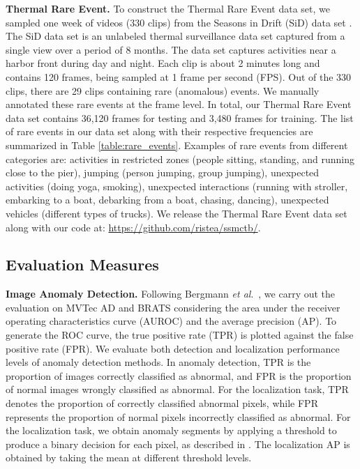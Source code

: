 \documentclass[10pt,journal,compsoc]{IEEEtran}
\newcommand{\etal}{\textit{et al}.}
\begin{document}
\noindent
\textbf{Thermal Rare Event.} To construct the Thermal Rare Event data set, we sampled one week of videos (330 clips) from the Seasons in Drift (SiD) data set \cite{Nikolov-NIPS-2021}. The SiD data set \cite{Nikolov-NIPS-2021} is an unlabeled thermal surveillance data set captured from a single view over a period of 8 months. The data set captures activities near a harbor front during day and night. Each clip is about 2 minutes long and contains 120 frames, being sampled at 1 frame per second (FPS). Out of the 330 clips, there are 29 clips containing rare (anomalous) events. We manually annotated these rare events at the frame level. In total, our Thermal Rare Event data set contains 36,120 frames for testing and 3,480 frames for training. The list of rare events in our data set along with their respective frequencies are summarized in Table \ref{table:rare_events}. Examples of rare events from different categories are: activities in restricted zones (people sitting, standing, and running close to the pier), jumping (person jumping, group jumping), unexpected activities (doing yoga, smoking), unexpected interactions (running with stroller, embarking to a boat, debarking from a boat, chasing, dancing), unexpected vehicles (different types of trucks). We release the Thermal Rare Event data set along with our code at: \url{https://github.com/ristea/ssmctb/}.

\subsection{Evaluation Measures}

\noindent
\textbf{Image Anomaly Detection.} 
Following Bergmann \etal~\cite{Bergmann-CVPR-2019}, we carry out the evaluation on MVTec AD and BRATS considering the area under the receiver operating characteristics curve (AUROC) and the average precision (AP). To generate the ROC curve, the true positive rate (TPR) is plotted against the false positive rate (FPR). We evaluate both detection and localization performance levels of anomaly detection methods. In anomaly detection, TPR is the proportion of images correctly classified as abnormal, and FPR is the proportion of normal images wrongly classified as abnormal. For the localization task, TPR denotes the proportion of correctly classified abnormal pixels, while FPR represents the proportion of normal pixels incorrectly classified as abnormal. For the localization task, we obtain anomaly segments by applying a threshold to produce a binary decision for each pixel, as described in \cite{Bergmann-CVPR-2019}. The localization AP is obtained by taking the mean at different threshold levels. 
\end{document}
